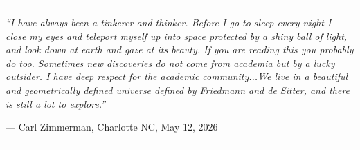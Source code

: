 \documentclass[12pt,a4paper]{article}
\begin{document}
\vspace{3em}
\begin{center}
\rule{0.8\textwidth}{0.4pt}
\vspace{1em}

\emph{``I have always been a tinkerer and thinker. Before I go to sleep every night I close my eyes and teleport myself up into space protected by a shiny ball of light, and look down at earth and gaze at its beauty. If you are reading this you probably do too. Sometimes new discoveries do not come from academia but by a lucky outsider. I have deep respect for the academic community...We live in a beautiful and geometrically defined universe defined by Friedmann and de Sitter, and there is still a lot to explore.''}

\vspace{0.5em}
--- Carl Zimmerman, Charlotte NC, May 12, 2026

\vspace{1em}
\rule{0.8\textwidth}{0.4pt}
\end{center}
\end{document}
